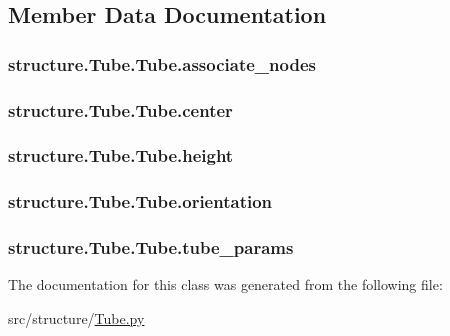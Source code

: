 \subsection{Member Data Documentation}
\hypertarget{classstructure_1_1_tube_1_1_tube_a21f57d07139cf053c09cd6894f87a92d}{
\subsubsection[{associate\-\_\-nodes}]{\setlength{\rightskip}{0pt plus 5cm}structure.\-Tube.\-Tube.\-associate\-\_\-nodes}}\label{classstructure_1_1_tube_1_1_tube_a21f57d07139cf053c09cd6894f87a92d}
\hypertarget{classstructure_1_1_tube_1_1_tube_a37f12c3efdc7cd783cd0236cf26825a4}{
\subsubsection[{center}]{\setlength{\rightskip}{0pt plus 5cm}structure.\-Tube.\-Tube.\-center}}\label{classstructure_1_1_tube_1_1_tube_a37f12c3efdc7cd783cd0236cf26825a4}
\hypertarget{classstructure_1_1_tube_1_1_tube_ae6c195f51ebedaf313f598bf679f6efe}{
\subsubsection[{height}]{\setlength{\rightskip}{0pt plus 5cm}structure.\-Tube.\-Tube.\-height}}\label{classstructure_1_1_tube_1_1_tube_ae6c195f51ebedaf313f598bf679f6efe}
\hypertarget{classstructure_1_1_tube_1_1_tube_a317a98eb11d85717df188e192e64fd14}{
\subsubsection[{orientation}]{\setlength{\rightskip}{0pt plus 5cm}structure.\-Tube.\-Tube.\-orientation}}\label{classstructure_1_1_tube_1_1_tube_a317a98eb11d85717df188e192e64fd14}
\hypertarget{classstructure_1_1_tube_1_1_tube_a806db8e6104a08da48f5c01fcb680090}{
\subsubsection[{tube\-\_\-params}]{\setlength{\rightskip}{0pt plus 5cm}structure.\-Tube.\-Tube.\-tube\-\_\-params}}\label{classstructure_1_1_tube_1_1_tube_a806db8e6104a08da48f5c01fcb680090}


The documentation for this class was generated from the following file\-:\begin{DoxyCompactItemize}
\item 
src/structure/\hyperlink{_tube_8py}{Tube.\-py}\end{DoxyCompactItemize}
